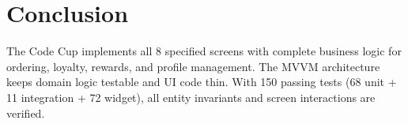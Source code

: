 \section{Conclusion}

The Code Cup implements all 8 specified screens with complete business logic for ordering, loyalty, rewards, and profile management. The MVVM architecture keeps domain logic testable and UI code thin. With 150 passing tests (68 unit + 11 integration + 72 widget), all entity invariants and screen interactions are verified.
